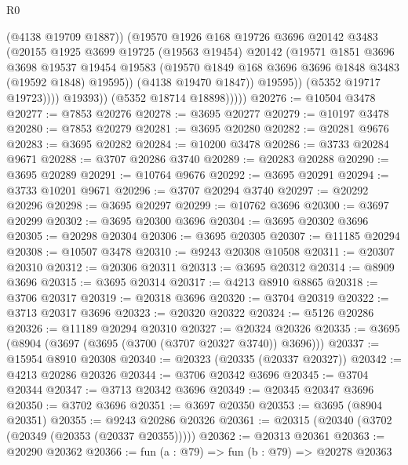 \begin{lexlean}{R0}
\begin{coremodule}
                          (@4138 @19709 @1887))
                        (@19570
                          @1926
                          @168
                          @19726
                          @3696
                          @20142
                          @3483
                          (@20155
                            @1925
                            @3699
                            @19725
                            (@19563 @19454)
                            @20142
                            (@19571
                              @1851
                              @3696
                              @3698
                              @19537
                              @19454
                              @19583
                              (@19570 @1849 @168 @3696 @3696 @1848 @3483 (@19592 @1848) @19595))
                            (@4138 @19470 @1847))
                          @19595))
                      (@5352 @19717 @19723))))
                @19393))
            (@5352 @18714 @18898)))))
@20276 := @10504 @3478
@20277 := @7853 @20276
@20278 := @3695 @20277
@20279 := @10197 @3478
@20280 := @7853 @20279
@20281 := @3695 @20280
@20282 := @20281 @9676
@20283 := @3695 @20282
@20284 := @10200 @3478
@20286 := @3733 @20284 @9671
@20288 := @3707 @20286 @3740
@20289 := @20283 @20288
@20290 := @3695 @20289
@20291 := @10764 @9676
@20292 := @3695 @20291
@20294 := @3733 @10201 @9671
@20296 := @3707 @20294 @3740
@20297 := @20292 @20296
@20298 := @3695 @20297
@20299 := @10762 @3696
@20300 := @3697 @20299
@20302 := @3695 @20300 @3696
@20304 := @3695 @20302 @3696
@20305 := @20298 @20304
@20306 := @3695 @20305
@20307 := @11185 @20294
@20308 := @10507 @3478
@20310 := @9243 @20308 @10508
@20311 := @20307 @20310
@20312 := @20306 @20311
@20313 := @3695 @20312
@20314 := @8909 @3696
@20315 := @3695 @20314
@20317 := @4213 @8910 @8865
@20318 := @3706 @20317
@20319 := @20318 @3696
@20320 := @3704 @20319
@20322 := @3713 @20317 @3696
@20323 := @20320 @20322
@20324 := @5126 @20286
@20326 := @11189 @20294 @20310
@20327 := @20324 @20326
@20335 := @3695 (@8904 (@3697 (@3695 (@3700 (@3707 @20327 @3740)) @3696)))
@20337 := @15954 @8910 @20308
@20340 := @20323 (@20335 (@20337 @20327))
@20342 := @4213 @20286 @20326
@20344 := @3706 @20342 @3696
@20345 := @3704 @20344
@20347 := @3713 @20342 @3696
@20349 := @20345 @20347 @3696
@20350 := @3702 @3696
@20351 := @3697 @20350
@20353 := @3695 (@8904 @20351)
@20355 := @9243 @20286 @20326
@20361 := @20315 (@20340 (@3702 (@20349 (@20353 (@20337 @20355)))))
@20362 := @20313 @20361
@20363 := @20290 @20362
@20366 := fun (a : @79) => fun (b : @79) => @20278 @20363

\end{coremodule}
\end{lexlean}
